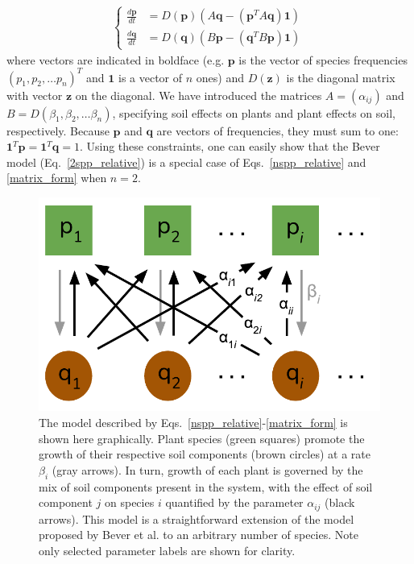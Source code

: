 \documentclass[11pt]{article}
\begin{document}
\begin{align} \label{matrix_form}
\begin{cases}
\frac{d\bm{p}}{dt} &= D(\bm{p}) \left(A \bm{q} - (\bm{p}^T A \bm{q}) \bm{1} \right) \\
\frac{d\bm{q}}{dt} &= D(\bm{q}) \left(B \bm{p} - (\bm{q}^T B \bm{p}) \bm{1}  \right) \,
\end{cases}
\end{align}
where vectors are indicated in boldface (e.g. $\bm{p}$ is the vector of species frequencies $(p_1, p_2, \dots p_n)^T$ and $\bm{1}$ is a vector of $n$ ones) and $D(\bm{z})$ is the diagonal matrix with vector $\bm{z}$ on the diagonal. We have introduced the matrices $A = (\alpha_{ij})$ and $B = D(\beta_1, \beta_2, \dots \beta_n)$, specifying soil effects on plants and plant effects on soil, respectively. Because $\bm{p}$ and $\bm{q}$ are vectors of frequencies, they must sum to one: $\bm{1}^T \bm{p} = \bm{1}^T \bm{q} = 1$. Using these constraints, one can easily show that the Bever model (Eq.~\ref{2spp_relative}) is a special case of Eqs.~\ref{nspp_relative} and \ref{matrix_form} when $n = 2$.

\begin{figure}
	\centering
	\includegraphics[width=\textwidth]{figure_1.pdf}
	\caption[Structure of the $n$-species Bever model]
	{The model described by Eqs.~\ref{nspp_relative}-\ref{matrix_form} is shown here graphically. Plant species (green squares) promote the growth of their respective soil components (brown circles) at a rate $\beta_i$ (gray arrows). In turn, growth of each plant is governed by the mix of soil components present in the system, with the effect of soil component $j$ on species $i$ quantified by the parameter $\alpha_{ij}$ (black arrows). This model is a straightforward extension of the model proposed by Bever et al. \citep{bever1997incorporating} to an arbitrary number of species. Note only selected parameter labels are shown for clarity.}
	\label{fig:concept}
\end{figure}
\end{document}
